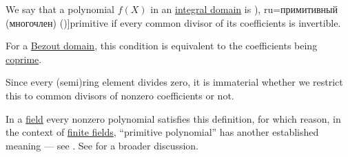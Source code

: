 \begin{definition}\label{def:domain_primitive_polynomial}
  We say that a polynomial \( f(X) \) in an \hyperref[def:integral_domain]{integral domain} is \term[bg=примитивен (полином) (\cite[43]{ГеновМиховскиМоллов1991Алгебра}), ru=примитивный (многочлен) (\cite[124]{Винберг2014КурсАлгебры})]{primitive} if every common divisor of its coefficients is invertible.
\end{definition}
\begin{comments}
  \item For a \hyperref[def:bezout_domain]{Bezout domain}, this condition is equivalent to the coefficients being \hyperref[def:coprime_elements]{coprime}.

  \item Since every (semi)ring element divides zero, it is immaterial whether we restrict this to common divisors of nonzero coefficients or not.

  \item In a \hyperref[def:field]{field} every nonzero polynomial satisfies this definition, for which reason, in the context of \hyperref[def:finite_field]{finite fields}, \enquote{primitive polynomial} has another established meaning --- see . See  for a broader discussion.
\end{comments}

